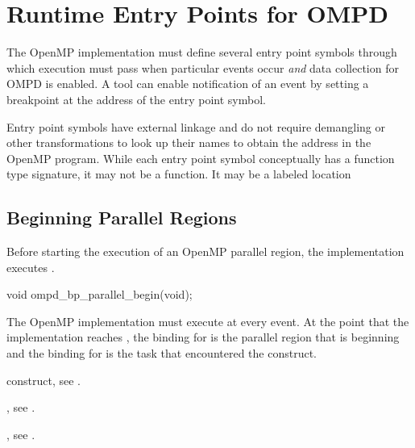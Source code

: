 \section{Runtime Entry Points for OMPD}
\label{subsec:runtime-entry-points-for-ompd}

The OpenMP implementation must define several entry point symbols 
through which execution must pass when particular events occur
\emph{and} data collection for OMPD is enabled. A tool can enable
notification of an event by setting a breakpoint at the address of 
the entry point symbol.

Entry point symbols have external  linkage and do not
require demangling or other transformations to look up their 
names to obtain the address in the OpenMP program. While each 
entry point symbol conceptually has a function type signature, 
it may not be a function. It may be a labeled location



\subsection{Beginning Parallel Regions}
\label{subsubsec:ompd_bp_parallel_begin}

\summary
Before starting the execution of an OpenMP parallel region, the 
implementation executes .

\format
\begin{cspecific}
\begin{ompSyntax}
void ompd_bp_parallel_begin(void);
\end{ompSyntax}
\end{cspecific}

\descr
The OpenMP implementation must execute  
at every  event. At the point that the implementation 
reaches , the binding for 
 is the parallel region that is 
beginning and the binding for 
is the task that encountered the  construct.

\begin{crossrefs}
\item {} construct, see .

\item {}, 
see .

\item {}, 
see .
\end{crossrefs}



